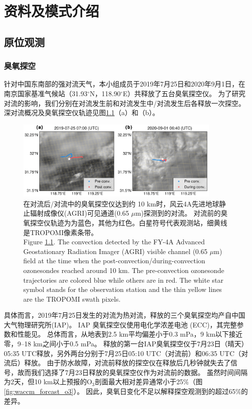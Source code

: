 
\chapter{资料及模式介绍}

\section{原位观测}

\subsection{臭氧探空}

针对中国东南部的强对流天气，本小组成员于2019年7月25日和2020年9月1日，在南京国家基准气候站（31.93$^{\circ}$N，118.90$^{\circ}$E）共释放了五台臭氧探空仪。
为了研究对流的影响，我们分别在对流发生前和对流发生中/对流发生后各释放一次探空。
深对流概况及臭氧探空仪轨迹见图\ref{fig:ozonesonde}（a）和（b）。

\begin{figure}[htbp]
\centering
\includegraphics[width=0.9\textwidth]{./figures/ozonesonde.png}
\caption{在对流后/对流中的臭氧探空仪达到约 10 km时，风云4A先进地球静止辐射成像仪(AGRI)可见通道(0.65 $\mu$m)探测到的对流。
对流前的臭氧探空仪轨迹为为蓝色，其他为红色。白星符号代表观测站，细黄线是TROPOMI像素条带。\\
Figure \ref{fig:ozonesonde}. The convection detected by the FY-4A Advanced Geostationary Radiation Imager (AGRI)
visible channel (0.65 $\mu$m) field at the time when the post-convection/during-convection ozonesondes reached around 10 km.
The pre-convection ozonesonde trajectories are colored blue while others are in red.
The white star symbol stands for the observation station and the thin yellow lines are the TROPOMI swath pixels.
}
\label{fig:ozonesonde}
\end{figure}


具体而言，2019年7月25日发生的对流为热对流，释放的三个臭氧探空均产自中国大气物理研究所(IAP)。
IAP 臭氧探空仪使用电化学浓差电池 (ECC)，其完整参数和性能见\citet{Zhang.2014}。
总体而言，从地表到2.5 km平均偏差小于0.3 mPa，9 km以下接近零，9--18 km之间小于0.5 mPa。
释放的第一台IAP臭氧探空仪于7月23日（晴天）05:35 UTC释放，另外两台分别于7月25日05:10 UTC（对流前）和06:35 UTC（对流后）释放。
由于防水故障，对流前释放的探空仪在释放后几秒钟就失去了信号，故而我们选择了7月23日释放的臭氧探空仪作为对流前的数据。
虽然时间间隔为2天，但10 km以上预报的O$_3$剖面最大相对差异通常小于25\%（图\ref{fig:waccm_forcast_o3}）。
因此，臭氧日变化不足以解释探空观测到的超过65\%的差异。

